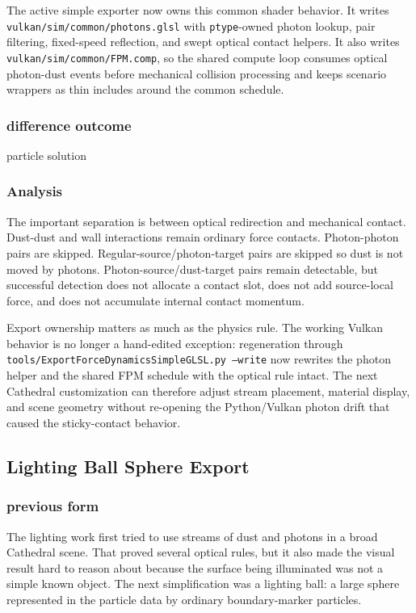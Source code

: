 The active simple exporter now owns this common shader behavior.  It writes
\texttt{vulkan/sim/common/photons.glsl} with \texttt{ptype}-owned photon
lookup, pair filtering, fixed-speed reflection, and swept optical contact helpers.  It
also writes \texttt{vulkan/sim/common/FPM.comp}, so the shared compute loop
consumes optical photon-dust events before mechanical collision processing and
keeps scenario wrappers as thin includes around the common schedule.

\subsubsection{difference outcome}

particle solution

\subsubsection{Analysis}

The important separation is between optical redirection and mechanical
contact.  Dust-dust and wall interactions remain ordinary force contacts.
Photon-photon pairs are skipped.  Regular-source/photon-target pairs are
skipped so dust is not moved by photons.  Photon-source/dust-target pairs
remain detectable, but successful detection does not allocate a contact slot,
does not add source-local force, and does not accumulate internal contact
momentum.

Export ownership matters as much as the physics rule.  The working Vulkan
behavior is no longer a hand-edited exception: regeneration through
\texttt{tools/ExportForceDynamicsSimpleGLSL.py --write} now rewrites the
photon helper and the shared FPM schedule with the optical rule intact.  The
next Cathedral customization can therefore adjust stream placement, material
display, and scene geometry without re-opening the Python/Vulkan photon drift
that caused the sticky-contact behavior.

\subsection{Lighting Ball Sphere Export}

\subsubsection{previous form}

The lighting work first tried to use streams of dust and photons in a broad
Cathedral scene.  That proved several optical rules, but it also made the
visual result hard to reason about because the surface being illuminated was
not a simple known object.  The next simplification was a lighting ball: a
large sphere represented in the particle data by ordinary boundary-marker
particles.

